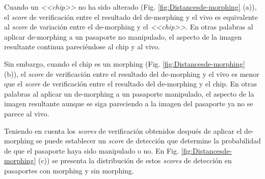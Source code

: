 Cuando un \textit{<<chip>>} no ha sido alterado (Fig. \ref{fig:Distancesde-morphing} (a)), el \textit{score} de verificación entre el resultado del \gls{de-morphing} y el \gls{vivo} es equivalente al \textit{score} de variación entre el \gls{de-morphing} y el \textit{<<\gls{chip}>>}. En otras palabras al aplicar \gls{de-morphing} a un pasaporte no manipulado, el aspecto de la imagen resultante continua pareciéndose al \gls{chip} y al \gls{vivo}.

Sin embargo, cuando el \gls{chip} es un \gls{morphing} (Fig. \ref{fig:Distancesde-morphing} (b)), el \textit{score} de verificación entre el resultado del \gls{de-morphing} y el \gls{vivo} es menor que el \textit{score} de verificación entre el resultado del \gls{de-morphing} y el \gls{chip}. En otras palabras al aplicar un \gls{de-morphing} a un pasaporte manipulado, el aspecto de la imagen resultante aunque se siga pareciendo a la imagen del pasaporte ya no se parece al \gls{vivo}.

Teniendo en cuenta los \textit{scores} de verificación obtenidos después de aplicar el \gls{de-morphing} se puede establecer un \textit{score} de detección que determine la probabilidad de que el pasaporte haya sido manipulado o no. En Fig. \ref{fig:Distancesde-morphing} (c)) se presenta la distribución de estos \textit{scores} de detección en pasaportes con \gls{morphing} y sin \gls{morphing}. 

